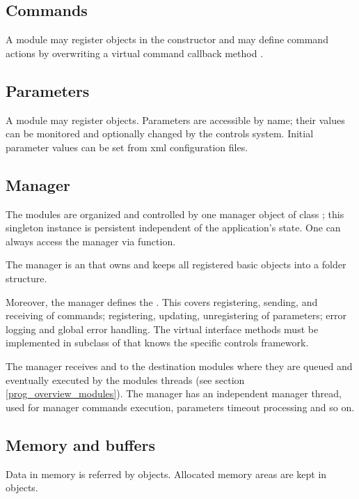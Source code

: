 \subsection{Commands}
A module may register  objects in the constructor and may define 
command actions by overwriting a virtual command callback method .

\subsection{Parameters}
A module may register   objects. 
Parameters are accessible by name; their values can be monitored and optionally changed by 
the controls system. Initial parameter values can be set from xml configuration files.   

\subsection{Manager}
The modules are organized and controlled by one manager object of 
class ;
this singleton instance is persistent independent of the application's state.
One can always access the manager via  function.

The manager is an  that owns and keeps all 
registered basic objects into a folder structure. 

Moreover, the manager defines the . 
This covers registering, sending, and receiving of commands; registering, 
updating, unregistering of parameters; error logging and global error handling. 
The virtual interface methods must be implemented in subclass of  that 
knows the specific controls framework.

The manager receives and  
to the destination modules where they are queued and eventually executed 
by the modules threads (see section \ref{prog_overview_modules}).
The manager has an independent manager thread, used for 
manager commands execution, parameters timeout processing and so on. 
 
 
\subsection{Memory and buffers}
Data in memory is referred by   objects. 
Allocated memory areas are kept in\\
objects. 
   

